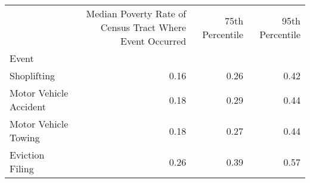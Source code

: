 \begin{tabular}{lrrr}
\toprule
 & Median Poverty Rate of Census Tract Where Event Occurred & 75th Percentile & 95th Percentile \\
Event &  &  &  \\
\midrule
Shoplifting & 0.16 & 0.26 & 0.42 \\
Motor Vehicle Accident & 0.18 & 0.29 & 0.44 \\
Motor Vehicle Towing & 0.18 & 0.27 & 0.44 \\
Eviction Filing & 0.26 & 0.39 & 0.57 \\
\bottomrule
\end{tabular}
